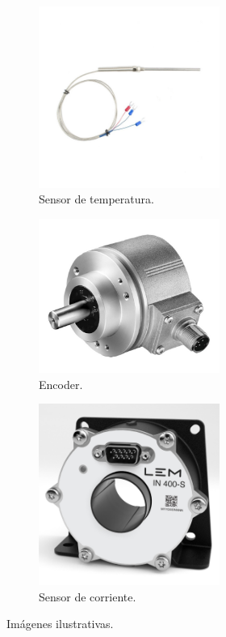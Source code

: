 \documentclass{article}
\begin{document}
\begin{figure}[ht]
    \centering
    \begin{subfigure}[b]{0.3\textwidth}
      \centering
      \includegraphics[width=0.65\textwidth]{Alan6.jpg}
      \caption{Sensor de temperatura.}
    \end{subfigure}
    \begin{subfigure}[b]{0.3\textwidth}
      \centering
      \includegraphics[width=0.65\textwidth]{Alan5.jpg}
      \caption{Encoder.}
    \end{subfigure}
    \begin{subfigure}[b]{0.3\textwidth}
      \centering
      \includegraphics[width=0.65\textwidth]{Alan4.jpg}
      \caption{Sensor de corriente.}
    \end{subfigure}
    \caption{Imágenes ilustrativas.}
  \end{figure}
\end{document}
